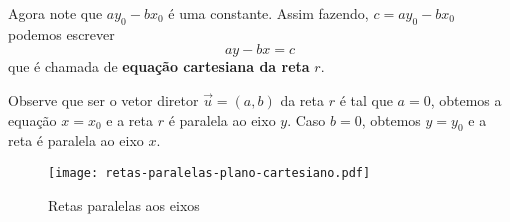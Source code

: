 Agora note que $ay_0 - bx_0$ \'e uma constante. Assim fazendo, $c = ay_0 - bx_0$ podemos escrever
\begin{equation}\label{equacao_cartesiana_reta_plano}
  ay - bx = c
\end{equation}
que \'e chamada de \textbf{equa\c{c}\~ao cartesiana da reta} $r$.

Observe que ser o vetor diretor $\vec{u} = (a,b)$ da reta $r$  \'e tal que $a = 0$, obtemos a equa\c{c}\~ao $x = x_0$ e a reta $r$ \'e paralela ao eixo $y$. Caso $b = 0$, obtemos $y = y_0$ e a reta \'e paralela ao eixo $x$.
\begin{figure}[!h]
  \centering
  \caption{Retas paralelas aos eixos}
  \texttt{[image: retas-paralelas-plano-cartesiano.pdf]}




\end{figure}

